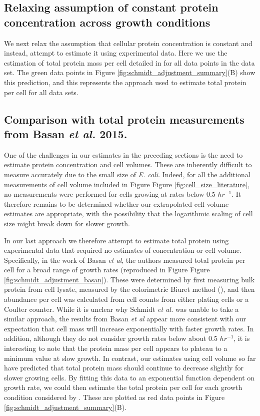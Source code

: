 \subsection{Relaxing assumption of constant protein concentration across growth conditions}
We next relax the assumption that cellular protein concentration is constant and
instead, attempt to  estimate it using experimental data. Here we use the
estimation of total protein mass per cell detailed in
 for all data points in the
\cite{schmidt2016} data set. The green data points in
Figure \ref{fig:schmidt_adjustment_summary}(B) show this prediction, and this represents
the approach used to estimate total protein per cell for all data sets.


\subsection{Comparison with total protein measurements from Basan \textit{et al.} 2015.}
One of the challenges in our estimates in the preceding  sections is the need to
estimate protein concentration and cell volumes. These are inherently difficult
to measure accurately due to the small size of \textit{E. coli}. Indeed, for all the
additional measurements of cell volume included in Figure
Figure \ref{fig:cell_size_literature}, no measurements were performed for cells growing
at rates below 0.5 $hr^{-1}$. It therefore remains to be determined whether our
extrapolated cell volume estimates are appropriate, with the possibility that
the logarithmic scaling of cell size might break down for slower growth.

In our last approach we therefore attempt to estimate total protein using
experimental data that required  no estimates of concentration or cell volume.
Specifically, in the work of  Basan \textit{et al}, the authors measured total
protein per cell for a broad range of growth rates (reproduced in Figure
Figure \ref{fig:schmidt_adjustment_basan}). These were determined by first measuring
bulk protein from cell lysate, measured by the colorimetric Biuret method
(\cite{You2013}), and then abundance per cell was calculated from cell counts
from either plating cells or a Coulter counter. While it is unclear why Schmidt
\textit{et al.} was unable to take a similar approach, the results from Basan
\textit{et al} appear more consistent with our expectation that cell mass will
increase exponentially with faster growth rates. In addition, although they do
not consider growth rates below about 0.5 $hr^{-1}$, it is interesting to note
that the protein mass per cell appears to plateau to a minimum value at slow
growth. In contrast, our estimates using cell volume so far have predicted that
total protein mass should continue to decrease slightly for slower growing
cells. By fitting this data to an exponential function dependent on growth rate,
we could then estimate the total protein per cell for each growth condition
considered by \cite{schmidt2016}. These are plotted as red data points in
Figure \ref{fig:schmidt_adjustment_summary}(B).



